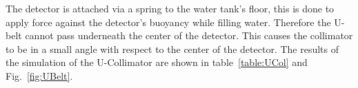 The detector is attached via a spring to the water tank's floor, this is done to apply force against the detector's buoyancy while filling water. Therefore the U-belt cannot pass underneath the center of the detector. This causes the collimator to be in a small angle with respect to the center of the detector.
The results of the simulation of the U-Collimator are shown in table~\ref{table:UCol} and Fig.~\ref{fig:UBelt}.



  

% 
%


\begin{table}
\begin{center}
\caption{result of GEANT4 simulation for a 10X10X10cm collimator with an aperture of $45 \deg$, a good event is an event that scattered only once in the FV with energy deposition of 2-15 keVee}
\label{table:UCol}
\end{center}
\end{table}



